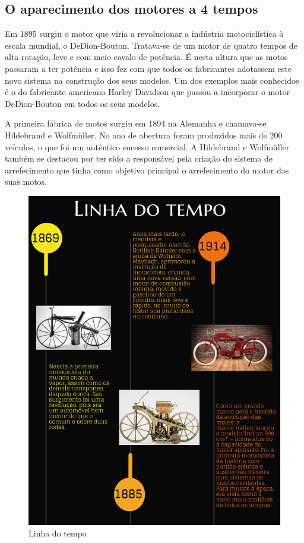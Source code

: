 \documentclass{report}
\begin{document}
\clearpage




\subsection{O aparecimento dos motores a 4 tempos}
Em 1895 surgiu o motor que viria a revolucionar a indústria motociclística à escala mundial, o DeDion-Bouton. Tratava-se de um motor de quatro tempos de alta rotação, leve e com meio cavalo de potência. É nesta altura que as motos passaram a ter potência e isso fez com que todos os fabricantes adotassem este novo sistema na construção dos seus modelos. Um dos exemplos mais conhecidos é o do fabricante americano Harley Davidson que passou a incorporar o motor DeDion-Bouton em todos os seus modelos.

A primeira fábrica de motos surgiu em 1894 na Alemanha e chamava-se Hildebrand e Wolfmüller. No ano de abertura foram produzidos mais de 200 veículos, o que foi um autêntico sucesso comercial. A Hildebrand e Wolfmüller também se destacou por ter sido a responsável pela criação do sistema de arrefecimento que tinha como objetivo principal o arrefecimento do motor das suas motos.

\begin{figure}[h]
\center
\includegraphics[scale=0.5]{linha do tempo1.jpeg} 
\caption{Linha do tempo }
\label{figura:linha do tempo}
\end{figure}
\end{document}
